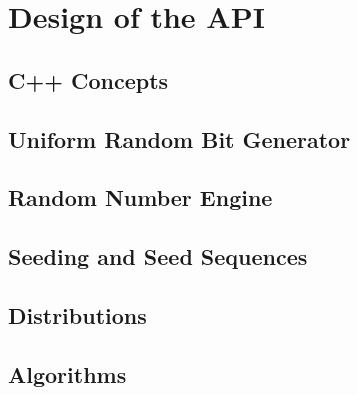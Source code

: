 \documentclass{stdlocal}
\begin{document}
\section{Design of the API} %
\label{sec:design_of_the_api}

  \subsection{C++ Concepts} %
  \label{sub:c_concepts}


  \subsection{Uniform Random Bit Generator} %
  \label{sub:uniform_random_bit_generator}


  \subsection{Random Number Engine} %
  \label{sub:random_number_engine}


  \subsection{Seeding and Seed Sequences} %
  \label{sub:seeding_and_seed_sequences}


  \subsection{Distributions} %
  \label{sub:distributions}


  \subsection{Algorithms} %
  \label{sub:algorithms}

\end{document}
